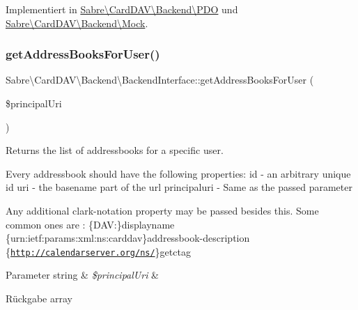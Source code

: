 Implementiert in \mbox{\hyperlink{class_sabre_1_1_card_d_a_v_1_1_backend_1_1_p_d_o_adcf44f8f25f73d511a8f9287957b2e62}{Sabre\textbackslash{}\+Card\+D\+A\+V\textbackslash{}\+Backend\textbackslash{}\+P\+DO}} und \mbox{\hyperlink{class_sabre_1_1_card_d_a_v_1_1_backend_1_1_mock_a20a607167096ba3a163823f1113afd86}{Sabre\textbackslash{}\+Card\+D\+A\+V\textbackslash{}\+Backend\textbackslash{}\+Mock}}.

\mbox{\label{interface_sabre_1_1_card_d_a_v_1_1_backend_1_1_backend_interface_a47302ae5f71c46e7e729f20fb4be65ec}} 
\subsubsection{\texorpdfstring{get\+Address\+Books\+For\+User()}{getAddressBooksForUser()}}
{\footnotesize\ttfamily Sabre\textbackslash{}\+Card\+D\+A\+V\textbackslash{}\+Backend\textbackslash{}\+Backend\+Interface\+::get\+Address\+Books\+For\+User (\begin{DoxyParamCaption}\item[{}]{\$principal\+Uri }\end{DoxyParamCaption})}

Returns the list of addressbooks for a specific user.

Every addressbook should have the following properties\+: id -\/ an arbitrary unique id uri -\/ the \textquotesingle{}basename\textquotesingle{} part of the url principaluri -\/ Same as the passed parameter

Any additional clark-\/notation property may be passed besides this. Some common ones are \+: \{D\+AV\+:\}displayname \{urn\+:ietf\+:params\+:xml\+:ns\+:carddav\}addressbook-\/description \{\href{http://calendarserver.org/ns/}{\tt http\+://calendarserver.\+org/ns/}\}getctag


\begin{DoxyParams}[1]{Parameter}
string & {\em \$principal\+Uri} & \\
\hline
\end{DoxyParams}
\begin{DoxyReturn}{Rückgabe}
array 
\end{DoxyReturn}


